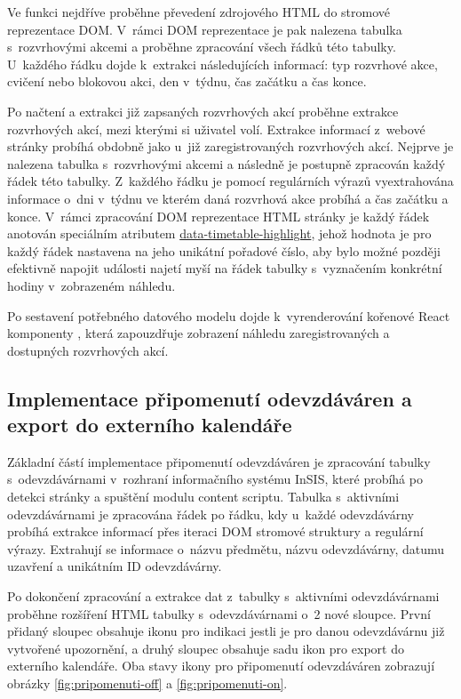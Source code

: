 Ve funkci  nejdříve proběhne převedení zdrojového HTML do stromové reprezentace DOM. V~rámci DOM reprezentace je pak nalezena tabulka s~rozvrhovými akcemi a proběhne zpracování všech řádků této tabulky. U~každého řádku dojde k~extrakci následujících informací: typ rozvrhové akce, cvičení nebo blokovou akci, den v~týdnu, čas začátku a čas konce. 

Po načtení a extrakci již zapsaných rozvrhových akcí proběhne extrakce rozvrhových akcí, mezi kterými si uživatel volí. Extrakce informací z~webové stránky probíhá obdobně jako u~již zaregistrovaných rozvrhových akcí. Nejprve je nalezena tabulka s~rozvrhovými akcemi a následně je postupně zpracován každý řádek této tabulky. Z~každého řádku je pomocí regulárních výrazů vyextrahována informace o~dni v~týdnu ve kterém daná rozvrhová akce probíhá a čas začátku a konce. V~rámci zpracování DOM reprezentace HTML stránky je každý řádek anotován speciálním atributem \url{data-timetable-highlight}, jehož hodnota je pro každý řádek nastavena na jeho unikátní pořadové číslo, aby bylo možné později efektivně napojit události najetí myší na řádek tabulky s~vyznačením konkrétní hodiny v~zobrazeném náhledu.

Po sestavení potřebného datového modelu dojde k~vyrenderování kořenové React komponenty , která zapouzdřuje zobrazení náhledu zaregistrovaných a dostupných rozvrhových akcí.

\subsection{Implementace připomenutí odevzdáváren a export do externího kalendáře}
    
Základní částí implementace připomenutí odevzdáváren je zpracování tabulky s~odevzdávárnami v~rozhraní informačního systému InSIS, které probíhá po detekci stránky a spuštění modulu content scriptu. Tabulka s~aktivními odevzdávárnami je zpracována řádek po řádku, kdy u~každé odevzdávárny probíhá extrakce informací přes iteraci DOM stromové struktury a regulární výrazy. Extrahují se informace o~názvu předmětu, názvu odevzdávárny, datumu uzavření a unikátním ID odevzdávárny.

Po dokončení zpracování a extrakce dat z~tabulky s~aktivními odevzdávárnami proběhne rozšíření HTML tabulky s~odevzdávárnami o~2 nové sloupce. První přidaný sloupec obsahuje ikonu pro indikaci jestli je pro danou odevzdávárnu již vytvořené upozornění, a druhý sloupec obsahuje sadu ikon pro export do externího kalendáře. Oba stavy ikony pro připomenutí odevzdáváren zobrazují obrázky \ref{fig:pripomenuti-off} a \ref{fig:pripomenuti-on}.

